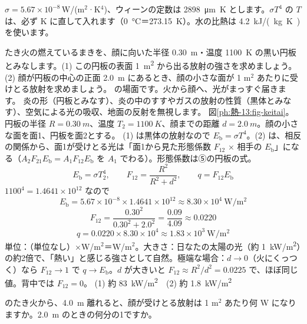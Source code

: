 
\noindent $\sigma=5.67\times10^{-8}$\,W/(m$^2$·K$^4$)、ウィーンの定数は \qty{2898}{\micro m.K} とします。$\sigma T^4$ の $T$ は、必ず K に直して入れます（\qty{0}{\celsius}＝\qty{273.15}{K}）。水の比熱は \qty{4.2}{kJ/(kg.K)} を使います。

\begin{phreidai}[たき火にあたる顔]
\label{ph:熱-13:ex1}たき火の燃えているまきを、顔に向いた半径 \qty{0.30}{m}・温度 \qty{1100}{K} の黒い円板とみなします。(1) この円板の表面 \qty{1}{m^2} から出る放射の強さを求めましょう。(2) 顔が円板の中心の正面 \qty{2.0}{m} にあるとき、顔の小さな面が 1 m$^2$ あたりに受けとる放射を求めましょう。
\phbamen
\bkhatenaref の場面です。火から顔へ、光がまっすぐ届きます。
\phmushi
炎の形（円板とみなす）、炎の中のすすやガスの放射の性質（黒体とみなす）、空気による光の吸収、地面の反射を無視します。
\phzu
図\ref{ph:熱-13:fig-keitai}。円板の半径 $R=\qty{0.30}{m}$、温度 $T_2=\qty{1100}{K}$、顔までの距離 $d=\qty{2.0}{m}$。顔の小さな面を面1、円板を面2とする。
\phriyu
(1) は黒体の放射なので $E_{\mathrm b}=\sigma T^4$。(2) は、相反の関係から、面1が受けとる光は「面1から見た形態係数 $F_{12}$ × 相手の $E_{\mathrm b}$」になる（$A_2F_{21}E_{\mathrm b}=A_1F_{12}E_{\mathrm b}$ を $A_1$ でわる）。形態係数は⑤の円板の式。
\phtateru
\[ E_{\mathrm b}=\sigma T_2^4,\qquad F_{12}=\frac{R^2}{R^2+d^2},\qquad q=F_{12}E_{\mathrm b} \]
\phtoku
$1100^4=1.4641\times10^{12}$ なので
\[ E_{\mathrm b}=5.67\times10^{-8}\times1.4641\times10^{12}\approx8.30\times10^4\ \mathrm{W/m^2} \]
\[ F_{12}=\frac{0.30^2}{0.30^2+2.0^2}=\frac{0.09}{4.09}\approx0.0220 \]
\[ q=0.0220\times8.30\times10^4\approx1.83\times10^3\ \mathrm{W/m^2} \]
\phtashikame
単位：（単位なし）×W/m$^2$＝W/m$^2$。大きさ：日なたの太陽の光（約 \qty{1}{kW/m^2}）の約2倍で、「熱い」と感じる強さとして自然。極端な場合：$d\to0$（火にくっつく）なら $F_{12}\to1$ で $q\to E_{\mathrm b}$。$d$ が大きいと $F_{12}\approx R^2/d^2=0.0225$ で、ほぼ同じ値。背中では $F_{12}=0$。
\kotae (1) 約 \qty{83}{kW/m^2}　(2) 約 \qty{1.8}{kW/m^2}
\end{phreidai}
\begin{jibun}
のたき火から、\qty{4.0}{m} 離れると、顔が受けとる放射は 1 m$^2$ あたり何 W になりますか。\qty{2.0}{m} のときの何分の1ですか。
\end{jibun}

